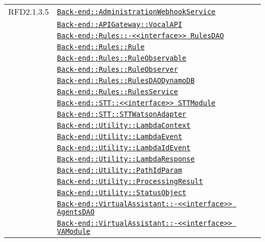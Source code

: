 \begin{longtable}{|>{\centering}m{3cm}|m{10cm}<{\centering}|}
RFD2.1.3.5 & \hyperref[Back-end::AdministrationWebhookService]{\texttt{Back-end::AdministrationWebhookService}}\\
& \hyperref[Back-end::APIGateway::VocalAPI]{\texttt{Back-end::APIGateway::VocalAPI}}\\
& \hyperref[Back-end::Rules::<<interface>> RulesDAO]{\texttt{Back-end::Rules::-\linebreak <<interface>> RulesDAO}}\\
& \hyperref[Back-end::Rules::Rule]{\texttt{Back-end::Rules::Rule}}\\
& \hyperref[Back-end::Rules::RuleObservable]{\texttt{Back-end::Rules::RuleObservable}}\\
& \hyperref[Back-end::Rules::RuleObserver]{\texttt{Back-end::Rules::RuleObserver}}\\
& \hyperref[Back-end::Rules::RulesDAODynamoDB]{\texttt{Back-end::Rules::RulesDAODynamoDB}}\\
& \hyperref[Back-end::Rules::RulesService]{\texttt{Back-end::Rules::RulesService}}\\
& \hyperref[Back-end::STT::<<interface>> STTModule]{\texttt{Back-end::STT::<<interface>> STTModule}}\\
& \hyperref[Back-end::STT::STTWatsonAdapter]{\texttt{Back-end::STT::STTWatsonAdapter}}\\
& \hyperref[Back-end::Utility::LambdaContext]{\texttt{Back-end::Utility::LambdaContext}}\\
& \hyperref[Back-end::Utility::LambdaEvent]{\texttt{Back-end::Utility::LambdaEvent}}\\
& \hyperref[Back-end::Utility::LambdaIdEvent]{\texttt{Back-end::Utility::LambdaIdEvent}}\\
& \hyperref[Back-end::Utility::LambdaResponse]{\texttt{Back-end::Utility::LambdaResponse}}\\
& \hyperref[Back-end::Utility::PathIdParam]{\texttt{Back-end::Utility::PathIdParam}}\\
& \hyperref[Back-end::Utility::ProcessingResult]{\texttt{Back-end::Utility::ProcessingResult}}\\
& \hyperref[Back-end::Utility::StatusObject]{\texttt{Back-end::Utility::StatusObject}}\\
& \hyperref[Back-end::VirtualAssistant::<<interface>> AgentsDAO]{\texttt{Back-end::VirtualAssistant::-\linebreak <<interface>> AgentsDAO}}\\
& \hyperref[Back-end::VirtualAssistant::<<interface>> VAModule]{\texttt{Back-end::VirtualAssistant::-\linebreak <<interface>> VAModule}}\\

\end{longtable}
